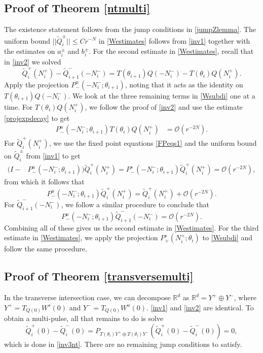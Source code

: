 \documentclass[12pt]{elsarticle}
\def\R{{\mathbb R}}
\begin{document}
\subsection{Proof of Theorem \ref{ntmulti}}

The existence statement follows from the jump conditions in \cref{jumpZlemma}. The uniform bound $||\tilde{Q}_i^\pm|| \leq C r^{-N}$ in \cref{Westimates} follows from \cref{inv1} together with the estimates on $a_i^\pm$ and $b_i^\pm$. For the second estimate in \cref{Westimates}, recall that in \cref{inv2} we solved
\begin{equation}\label{Wsubdi}
\tilde{Q}_i^+(N_i^+) - \tilde{Q}_{i+1}^-(-N_i^-) = T(\theta_{i+1}) Q(-N_i^-) - T(\theta_i) Q(N_i^+).
\end{equation}
Apply the projection $P^u_-(-N_i^-; \theta_{i+1})$, noting that it acts as the identity on $T(\theta_{i+1}) Q(-N_i^-)$. We look at the three remaining terms in \cref{Wsubdi} one at a time. For $T(\theta_i) Q(N_i^+)$, we follow the proof of \cref{inv2} and use the estimate \cref{projexpdecay} to get
\begin{align*}
P^u_-(-N_i^-; \theta_{i+1})T(\theta_i) Q(N_i^+)
&= \mathcal{O}(r^{-2N}).
\end{align*}
For $\tilde{Q}_i^+(N_i^+)$, we use the fixed point equations \cref{FPeqs1} and the uniform bound on $\tilde{Q}_i^\pm$ from \cref{inv1} to get
\begin{align*}
(I - &P^u_-(-N_i^-; \theta_{i+1})) \tilde{Q}_i^+(N_i^+) = P^s_-(-N_i^-; \theta_{i+1}) \tilde{Q}_i^+(N_i^+) = \mathcal{O}(r^{-2N}),
\end{align*}
from which it follows that
\[
P^u_-(-N_i^-; \theta_{i+1}) \tilde{Q}_i^+(N_i^+) = \tilde{Q}_i^+(N_i^+) + \mathcal{O}(r^{-2N}).
\]
For $\tilde{Q}_{i+1}^-(-N_i^-)$, we follow a similar procedure to conclude that
\[
P^u_-(-N_i^-; \theta_{i+1}) \tilde{Q}_{i+1}^-(-N_i^-) = \mathcal{O}(r^{-2N}).
\]
Combining all of these gives us the second estimate in \cref{Westimates}. For the third estimate in \cref{Westimates}, we apply the projection $P^s_+(N_i^+; \theta_i)$ to \cref{Wsubdi} and follow the same procedure.

\subsection{Proof of Theorem \ref{transversemulti}}

In the transverse intersection case, we can decompose $\R^d$ as $\R^d = Y^+ \oplus Y^-$, where $Y^+ = T_{Q(0)} W^s(0)$ and $Y^- = T_{Q(0)} W^u(0)$. \cref{inv1} and \cref{inv2} are identical. To obtain a multi-pulse, all that remains to do is solve 
\[
\tilde{Q}_i^+(0) - \tilde{Q}_i^-(0) = P_{T(\theta_i)Y^+ \oplus T(\theta_i)Y^-}( \tilde{Q}_i^+(0) - \tilde{Q}_i^-(0) ) = 0,
\]
which is done in \cref{inv3nt}. There are no remaining jump conditions to satisfy.
\end{document}
